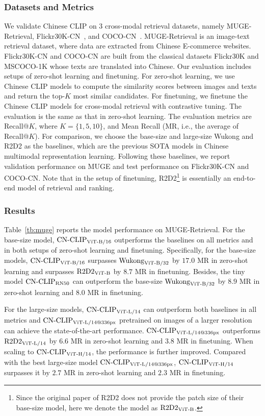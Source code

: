 \documentclass[11pt]{article}
\begin{document}
\subsubsection{Datasets and Metrics}
We validate Chinese CLIP on $3$ cross-modal retrieval datasets, namely MUGE-Retrieval, Flickr30K-CN~\cite{flickr30k-cn}, and COCO-CN~\cite{coco-cn}. 
MUGE-Retrieval is an image-text retrieval dataset, where data are extracted from Chinese E-commerce websites. 
Flickr30K-CN and COCO-CN are built from the classical datasets Flickr30K and MSCOCO-1K whose texts are translated into Chinese. 
Our evaluation includes setups of zero-shot learning and finetuning. 
For zero-shot learning, we use Chinese CLIP models to compute the similarity scores between images and texts and return the top-$K$ most similar candidates. For finetuning, we finetune the Chinese CLIP models for cross-modal retrieval with contrastive tuning. The evaluation is the same as that in zero-shot learning. 
The evaluation metrics are Recall@$K$, where $K = \{1, 5, 10\}$, and Mean Recall (MR, i.e., the average of Recall@$K$). 
For comparison, we choose the base-size and large-size Wukong and R2D2 as the baselines, which are the previous SOTA models in Chinese multimodal representation learning. 
Following these baselines, we report validation performance on MUGE and test performance on Flickr30K-CN and COCO-CN.
Note that in the setup of finetuning, R2D2\footnote{Since the original paper of R2D2 does not provide the patch size of their base-size model, here we denote the model as $\text{R2D2}\rm_{ViT\text{-}B}$.} is essentially an end-to-end model of retrieval and ranking. 

\subsubsection{Results}
\label{subsubsec:results}
Table~\ref{tb:muge} reports the model performance on MUGE-Retrieval. For the base-size model, $\text{CN-CLIP}\rm_{ViT\text{-}B/16}$ outperforms the baselines on all metrics and in both setups of zero-shot learning and finetuning. 
Specifically, for the base-size models, $\text{CN-CLIP}\rm_{ViT\text{-}B/16}$ surpasses $\text{Wukong}\rm_{ViT\text{-}B/32}$ by $17.0$ MR in zero-shot learning and surpasses $\text{R2D2}\rm_{ViT\text{-}B}$ by $8.7$ MR in finetuning. 
Besides, the tiny model $\text{CN-CLIP}\rm_{RN50}$ can outperform the base-size $\text{Wukong}\rm_{ViT\text{-}B/32}$ by $8.9$ MR in zero-shot learning and $8.0$ MR in finetuning. 

For the large-size models, $\text{CN-CLIP}\rm_{ViT\text{-}L/14}$ can outperform both baselines in all metrics and $\text{CN-CLIP}\rm_{ViT\text{-}L/14@336px}$ pretrained on images of a larger resolution can achieve the state-of-the-art performance. $\text{CN-CLIP}\rm_{ViT\text{-}L/14@336px}$ outperforms $\text{R2D2}\rm_{ViT\text{-}L/14}$ by $6.6$ MR in zero-shot learning and $3.8$ MR in finetuning. 
When scaling to $\text{CN-CLIP}\rm_{ViT\text{-}H/14}$, the performance is further improved. Compared with the best large-size model $\text{CN-CLIP}\rm_{ViT\text{-}L/14@336px}$, $\text{CN-CLIP}\rm_{ViT\text{-}H/14}$ surpasses it by $2.7$ MR in zero-shot learning and $2.3$ MR in finetuning. 
\end{document}
